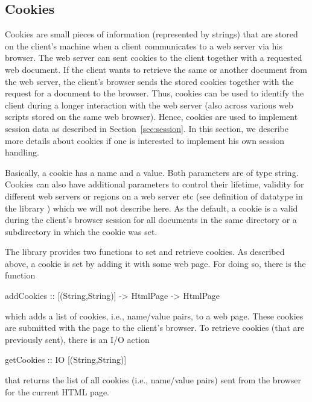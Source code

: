 \subsection{Cookies}

Cookies are small pieces of information
(represented by strings) that are stored on the client's machine
when a client communicates to a web server via his browser.
The web server can sent cookies to the client together
with a requested web document. If the client wants to retrieve
the same or another document from the web server, the client's browser
sends the stored cookies together with the request for a document
to the browser.
Thus, cookies can be used to identify the client during a longer
interaction with the web server (also across various web scripts
stored on the same web browser).
Hence, cookies are used to implement session data
as described in Section~\ref{sec:session}.
In this section, we describe more details about cookies
if one is interested to implement his own session handling.

Basically, a cookie has a name and a value.
Both parameters are of type string.
Cookies can also have additional parameters to control their
lifetime, validity for different web servers or regions
on a web server etc (see definition of datatype
 in the library ) which we will not describe
here. As the default, a cookie is a valid during the client's
browser session for all documents in the same directory or
a subdirectory in which the cookie was set.

The library  provides two functions to set
and retrieve cookies.
As described above, a cookie is set by adding it with some
web page. For doing so, there is the function
%
\begin{curry}
addCookies :: [(String,String)] -> HtmlPage -> HtmlPage
\end{curry}
%
which adds a list of cookies, i.e., name/value pairs, to a web page.
These cookies are submitted with the page to the client's browser.
To retrieve cookies (that are previously sent),
there is an I/O action
%
\begin{curry}
getCookies :: IO [(String,String)]
\end{curry}
%
that returns the list of all cookies (i.e., name/value pairs)
sent from the browser for the current HTML page.

